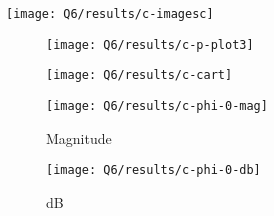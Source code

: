 \documentclass[12pt,onecolumn,a4paper]{article}
\begin{document}
\begin{figure}[H]
	\centering
	\texttt{[image: Q6/results/c-imagesc]}
	\caption{}
	\label{fig:c-imagesc}
\end{figure}


\begin{figure}[H]
	\begin{subfigure}{.5\linewidth}
		\centering
		\texttt{[image: Q6/results/c-p-plot3]}
		\caption{}
		\label{fig:c-p-plot3}
	\end{subfigure}
	\begin{subfigure}{.5\linewidth}
		\centering
		\texttt{[image: Q6/results/c-cart]}
		\caption{}
		\label{fig:c-cart}
	\end{subfigure}
	\caption{}
\end{figure}


\begin{figure}[H]
	\centering
	\begin{subfigure}{\linewidth}
		\centering
		\texttt{[image: Q6/results/c-phi-0-mag]}
		\caption{Magnitude}
		\label{fig:c-phi-0-mag}
	\end{subfigure}
	
	\begin{subfigure}{\linewidth}
		\centering
		\texttt{[image: Q6/results/c-phi-0-db]}
		\caption{dB}
		\label{fig:c-phi-0-db}
	\end{subfigure}
	\caption{}
\end{figure}


	
	\newpage
	
	
	
\end{document}
